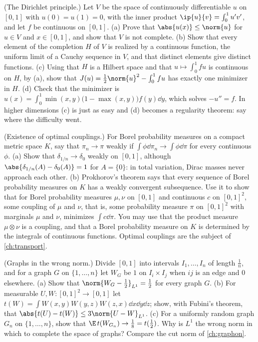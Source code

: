 \begin{refsection}
\begin{exercises}
\item\label{ex:lebesgue:dirichlet} \transfer\hard (The Dirichlet principle.) Let $V$ be the space of continuously differentiable $u$ on $[0,1]$ with $u(0)=u(1)=0$, with the inner product $\ip{u}{v}=\int_0^1u'v'$, and let $f$ be continuous on $[0,1]$. (a) Prove that $\abs{u(x)}\le\norm{u}$ for $u\in V$ and $x\in[0,1]$, and show that $V$ is not complete. (b) Show that every element of the completion $H$ of $V$ is realized by a continuous function, the uniform limit of a Cauchy sequence in $V$, and that distinct elements give distinct functions. (c) Using that $H$ is a Hilbert space and that $u\mapsto\int_0^1fu$ is continuous on $H$, by (a), show that $J(u)=\frac12\norm{u}^2-\int_0^1fu$ has exactly one minimizer in $H$. (d) Check that the minimizer is $u(x)=\int_0^1\min(x,y)\bigl(1-\max(x,y)\bigr)f(y)\dd y$, which solves $-u''=f$. In higher dimensions (c) is just as easy and (d) becomes a regularity theorem: say where the difficulty went. 

\item\label{ex:lebesgue:coupling} \transfer (Existence of optimal couplings.) For Borel probability measures on a compact metric space $K$, say that $\pi_n\to\pi$ weakly if $\int\phi\dd\pi_n\to\int\phi\dd\pi$ for every continuous $\phi$. (a) Show that $\delta_{1/n}\to\delta_0$ weakly on $[0,1]$, although $\abs{\delta_{1/n}(A)-\delta_0(A)}=1$ for $A=\{0\}$: in total variation, Dirac masses never approach each other. (b) Prokhorov's theorem says that every sequence of Borel probability measures on $K$ has a weakly convergent subsequence. Use it to show that for Borel probability measures $\mu,\nu$ on $[0,1]$ and continuous $c$ on $[0,1]^2$, some coupling of $\mu$ and $\nu$, that is, some probability measure $\pi$ on $[0,1]^2$ with marginals $\mu$ and $\nu$, minimizes $\int c\dd\pi$. You may use that the product measure $\mu\otimes\nu$ is a coupling, and that a Borel probability measure on $K$ is determined by the integrals of continuous functions. Optimal couplings are the subject of \cref{ch:transport}.

\item\label{ex:lebesgue:graphs} \transfer (Graphs in the wrong norm.) Divide $[0,1]$ into intervals $I_1,\dots,I_n$ of length $\frac1n$, and for a graph $G$ on $\{1,\dots,n\}$ let $W_G$ be $1$ on $I_i\times I_j$ when $ij$ is an edge and $0$ elsewhere. (a) Show that $\norm{W_G-\frac12}_{L^1}=\frac12$ for every graph $G$. (b) For measurable $U,W\colon[0,1]^2\to[0,1]$ let $t(W)=\int W(x,y)W(y,z)W(z,x)\dd x\dd y\dd z$; show, with Fubini's theorem, that $\abs{t(U)-t(W)}\le3\norm{U-W}_{L^1}$. (c) For a uniformly random graph $G_n$ on $\{1,\dots,n\}$, show that $\E\,t(W_{G_n})\to\frac18=t(\frac12)$. Why is $L^1$ the wrong norm in which to complete the space of graphs? Compare the cut norm of \cref{ch:graphon}.


\end{exercises}
\end{refsection}
